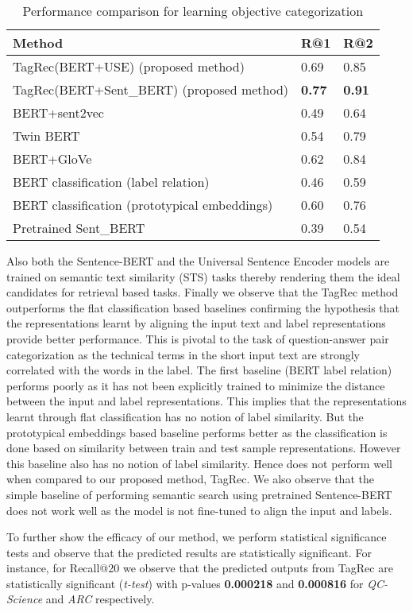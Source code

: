 \documentclass[runningheads, envcountsame, a4paper]{llncs}
\begin{document}
 \begin{table}
 \small
 \centering
\caption{Performance comparison for learning objective categorization}\label{tab1}
\begin{tabular}{p{7.2cm}|p{1cm}|p{1cm}}
 Method & R@1& R@2\\
\hline\hline
 TagRec(BERT+USE) (proposed method) &  0.69 &0.85\\ 
TagRec(BERT+Sent\_BERT) (proposed method) & \bf 0.77 & \bf 0.91 \\ 
BERT+sent2vec & 0.49 &0.64\\ 
Twin BERT \cite{twinbert} & 0.54 &0.79\\ 
BERT+GloVe & 0.62 &0.84\\ 
BERT classification (label relation) \cite{xumulti} \ & 0.46 &0.59\\ 
BERT classification (prototypical embeddings) \cite{snell2017prototypical} & 0.60 &0.76 \\ 
 Pretrained Sent\_BERT  & 0.39 &0.54  \\ 
\hline

\end{tabular}
\end{table}
Also both the Sentence-BERT and the Universal Sentence Encoder models are trained on semantic text similarity (STS) tasks thereby rendering them the ideal candidates for retrieval based tasks. Finally we observe that the TagRec method outperforms the flat classification based baselines confirming the hypothesis that the representations learnt by aligning the input text and label representations provide better performance. This is pivotal to the task of question-answer pair categorization as the technical terms in the short input text are strongly correlated with the words in the label. The first baseline (BERT label relation) performs poorly as it has not been explicitly trained to minimize the distance between the input and label representations. This implies that the representations learnt through flat classification has no notion of label similarity. But the prototypical embeddings based baseline performs better as the classification is done based on similarity between train and test sample representations. However this baseline also has no notion of label similarity. Hence does not perform well when compared to our proposed method, TagRec. We also observe that the simple baseline of performing semantic search using pretrained Sentence-BERT does not work well as the model is not fine-tuned to align the input and labels.

To further show the efficacy of our method, we perform statistical significance tests and observe that the predicted results are statistically significant. For instance, for Recall@20 we observe that the predicted outputs from TagRec are statistically significant (\textit{t-test}) with p-values \textbf{0.000218} and \textbf{0.000816} for \textit{QC-Science} and \textit{ARC} respectively.
\end{document}
